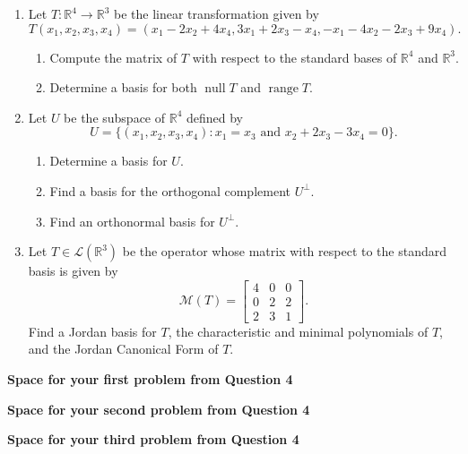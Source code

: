\documentclass[12pt]{article}
\newcommand{\R}{\mathbb{R}}
\DeclareMathOperator{\nul}{null}
\DeclareMathOperator{\range}{range}
\renewcommand{\L}{\mathcal{L}}
\begin{document}
\begin{enumerate}
\begin{enumerate}
\bigskip


\item Let $T:\R^4\to\R^3$ be the linear transformation given by
\[
 T(x_1,x_2,x_3,x_4) = (x_1-2x_2+4x_4,3x_1+2x_3-x_4,-x_1-4x_2-2x_3+9x_4).
\]
\begin{enumerate}
 \item Compute the matrix of $T$ with respect to the standard bases of $\R^4$ and $\R^3$. 
 \item Determine a basis for both $\nul T$ and $\range T$.
\end{enumerate}

\bigskip


\item Let $U$ be the subspace of $\R^4$ defined by
\[
 U = \{(x_1,x_2,x_3,x_4) : x_1=x_3 \text{ and } x_2+2x_3-3x_4=0\}.
\]
\begin{enumerate}
 \item Determine a basis for $U$.
 \item Find a basis for the orthogonal complement $U^\bot$.
 \item Find an orthonormal basis for $U^\bot$.
\end{enumerate}

\bigskip

\item Let $T\in\L(\R^3)$ be the operator whose matrix with respect to the standard basis is given by
\[
 \mathcal{M}(T) = \begin{bmatrix}4&0&0\\0&2&2\\2&3&1\end{bmatrix}.
\]
Find a Jordan basis for $T$, the characteristic and minimal polynomials of $T$, and the Jordan Canonical Form of $T$.
\end{enumerate}

\newpage

\begin{center}
 {\bf Space for your first problem from Question 4}
\end{center}

\newpage


\begin{center}
 {\bf Space for your second problem from Question 4}
\end{center}

\newpage


\begin{center}
 {\bf Space for your third problem from Question 4}
\end{center}


\end{enumerate}
\end{document}
